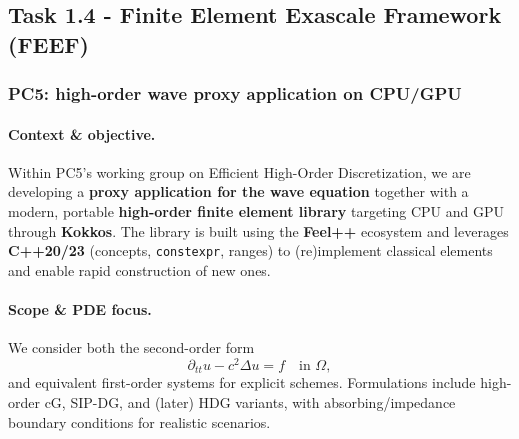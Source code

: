 \medskip

\subsection{Task 1.4 - Finite Element Exascale Framework (FEEF)}
\label{sec:wp1:t1.4}

\subsubsection{PC5: high-order wave proxy application on CPU/GPU}

\paragraph{Context \& objective.}
Within PC5’s working group on Efficient High-Order Discretization, we are developing a \textbf{proxy application for the wave equation} together with a modern, portable \textbf{high-order finite element library} targeting CPU and GPU through \textbf{Kokkos}. The library is built using the \textbf{Feel++} ecosystem and leverages \textbf{C++20/23} (concepts, \texttt{constexpr}, ranges) to (re)implement classical elements and enable rapid construction of new ones.

\paragraph{Scope \& PDE focus.}
We consider both the second-order form
\[
  \partial_{tt} u - c^2 \Delta u = f \quad \text{in }\Omega,
\]
and equivalent first-order systems for explicit schemes. Formulations include high-order cG, SIP-DG, and (later) HDG variants, with absorbing/impedance boundary conditions for realistic scenarios.

